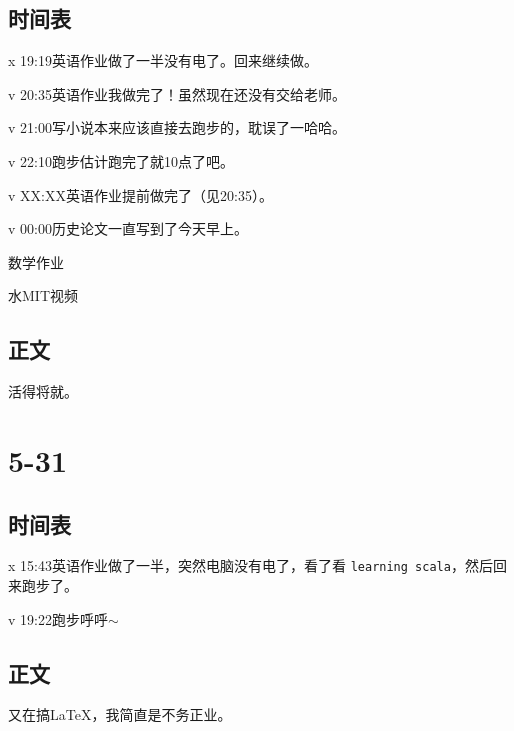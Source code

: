 \documentclass{peterlitsdoc}
\begin{document}
\subsection{时间表}

\begin{pltplan}
\item[x]{19:19}{英语作业}{做了一半没有电了。回来继续做。}
\item[v]{20:35}{英语作业}{我做完了！虽然现在还没有交给老师。}
\item[v]{21:00}{写小说}{本来应该直接去跑步的，耽误了一哈哈。}
\item[v]{22:10}{跑步}{估计跑完了就10点了吧。}
\item[v]{XX:XX}{英语作业}{提前做完了（见20:35）。}
\item[v]{00:00}{历史论文}{一直写到了今天早上。}
\item[ ]{}{数学作业}{}
\item[ ]{}{水MIT视频}{}
\end{pltplan}

\subsection{正文}

活得将就。


\section{5-31}

\subsection{时间表}

\begin{pltplan}
\item[x]{15:43}{英语作业}{做了一半，突然电脑没有电了，看了看
    \verb|learning scala|，然后回来跑步了。}
\item[v]{19:22}{跑步}{呼呼$\sim$}
\end{pltplan}

\subsection{正文}

又在搞\LaTeX{}，我简直是不务正业。
\end{document}
